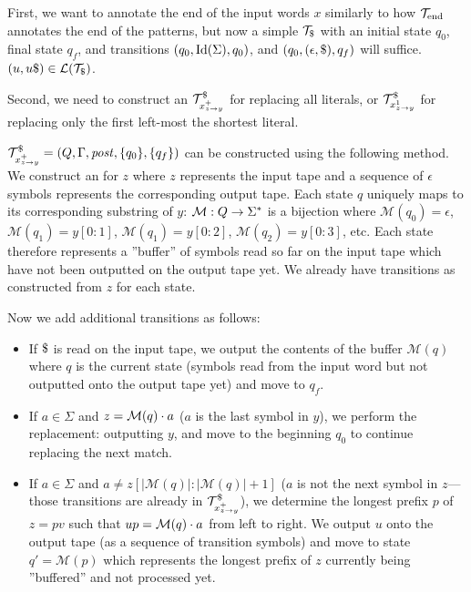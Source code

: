 First, we want to annotate the end of the input words $x$ similarly to how $\mathcal{T}_{\text{end}}$ annotates the end of the patterns, but now a simple \nft $\ft_\marker$ with an initial state $q_0$, final state $q_f$, and transitions $(q_0, \text{Id}(\Sigma), q_0)$, and $(q_0, (\epsilon, \$), q_f)$ will suffice. $(u, u\$) \in \mathcal{L}(\mathcal{T}_\$)$.

Second, we need to construct an \nft $\mathcal{T}^\$_{x^{+}_{z \rightarrow y}}$ for replacing all literals, or $\mathcal{T}^\$_{x^{1}_{z \rightarrow y}}$ for replacing only the first left-most the shortest literal.

$\mathcal{T}^\$_{x^{+}_{z \rightarrow y}} = (Q, \Gamma, \mathit{post}, \{ q_0 \}, \{ q_f \})$ can be constructed using the following method.
We construct an \nft for $z$ where $z$ represents the input tape and a sequence of $\epsilon$ symbols represents the corresponding output tape.
Each state $q$ uniquely maps to its corresponding substring of $y$: $\mathcal{M}: Q \rightarrow \Sigma^*$ is a bijection where $\mathcal{M}(q_0) = \epsilon$, $\mathcal{M}(q_1) = y[0:1]$, $\mathcal{M}(q_1) = y[0:2]$, $\mathcal{M}(q_2) = y[0:3]$, etc.
Each state therefore represents a ''buffer'' of symbols read so far on the input tape which have not been outputted on the output tape yet.
We already have transitions as constructed from $z$ for each state.

Now we add additional transitions as follows:\newline
\begin{itemize}
  \item If $\marker$ is read on the input tape, we output the contents of the buffer $\mathcal{M}(q)$ where $q$ is the current state (symbols read from the input word but not outputted onto the output tape yet) and move to $q_f$.
  \item If $a \in \Sigma$ and $z = \mathcal{M}(q) \cdot a$ ($a$ is the last symbol in $y$), we perform the replacement: outputting $y$, and move to the beginning $q_0$ to continue replacing the next match.
  \item If $a \in \Sigma$ and $a \neq z[|\mathcal{M}(q)|:|\mathcal{M}(q)| + 1]$ ($a$ is not the next symbol in $z$---those transitions are already in  $\mathcal{T}^\$_{x^{+}_{z \rightarrow y}}$), we determine the longest prefix $p$ of $z = pv$ such that $up = \mathcal{M}(q) \cdot a$ from left to right.
  We output $u$ onto the output tape (as a sequence of transition symbols) and move to state $q' = \mathcal{M}(p)$ which represents the longest prefix of $z$ currently being ''buffered'' and not processed yet.
\end{itemize}

